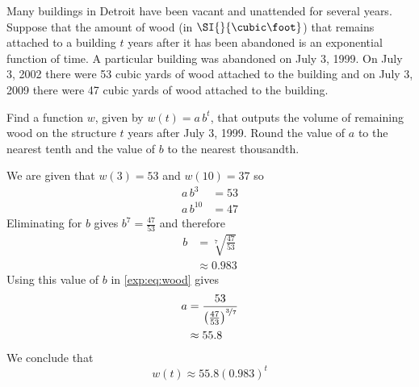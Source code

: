 \begin{pccexample}
	Many buildings in Detroit have been vacant and unattended for several
	years. Suppose that the amount of wood (in $\SI{}{\cubic\foot}$) that remains
	attached to a building $t$ years after it has been abandoned is 
	an exponential function of time. A particular building was abandoned on July 3, 1999. On July 3, 2002 there were 53 cubic yards of wood attached to the building and on July 3, 2009 there were 47 cubic yards of wood attached to the building.
										
	Find a function $w$, given by $w(t)=a\, b^t$, that outputs the volume of remaining wood
	on the structure $t$ years after July 3, 1999. Round the value of $a$ to the nearest tenth 
	and the value of $b$ to the nearest thousandth.
	\begin{pccsolution}
		We are given that $w(3)=53$ and $w(10)=37$ so
		\begin{align}
			a\,b^3    & = 53\label{exp:eq:wood} \\
			a\,b^{10} & =47 \nonumber           
		\end{align}
		Eliminating for $b$ gives $b^7=\frac{47}{53}$ and therefore
		\begin{align*}
			b & = \sqrt[7]{\frac{47}{53}} \\
			  & \approx 0.983             
		\end{align*}
		Using this value of $b$ in \cref{exp:eq:wood} gives
		\begin{align*}
			a & = \frac{53}{\left( \frac{47}{53} \right)^{\nicefrac{3}{7}}} \\
			  & \approx 55.8                                                
		\end{align*}
		We conclude that 
		\[
			w(t)  \approx 55.8(0.983)^t
		\]
	\end{pccsolution}
\end{pccexample}
			
